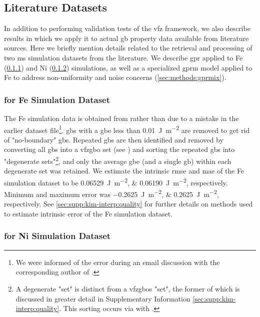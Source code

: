\documentclass[final,twocolumn,12pt]{elsarticle}
\begin{document}
\subsection{Literature Datasets}
\label{sec:methods:litdata}
In addition to performing validation tests of the \gls{vfz} framework, we also describe results in which we apply it to actual \gls{gb} property data available from literature sources. Here we briefly mention details related to the retrieval and processing of two \gls{ms} simulation datasets from the literature. We describe \gls{gpr} applied to Fe (\cref{sec:methods:gprsim}) and Ni (\cref{sec:methods:gprsim-Ni}) simulations, as well as a specialized \gls{gprm} model applied to Fe to address non-uniformity and noise concerns (\cref{sec:methods:gprmix}).

\subsubsection{ for Fe Simulation Dataset}
\label{sec:methods:gprsim}
The Fe simulation data is obtained from \cite{kimPhasefieldModeling3D2014} rather than \cite{kimIdentificationSchemeGrain2011} due to a mistake in the earlier dataset file\footnote{We were informed of the error during an email discussion with the corresponding author of \cite{kimPhasefieldModeling3D2014}.}. \Glspl{gb} with a \gls{gbe} less than \SI{0.01}{\joule\per\square\meter} are removed to get rid of "no-boundary" \glspl{gb}. Repeated \glspl{gb} are then identified and removed by converting all \glspl{gb} into a \gls{vfzgbo} set (see ) and sorting the repeated \glspl{gb} into "degenerate sets"\footnote{A degenerate "set" is distinct from a \glspl{vfzgbo} "set", the former of which is discussed in greater detail in Supplementary Information \cref{sec:supp:kim-interp:quality}. This sorting occurs via  with .}, and only the average \gls{gbe} (and a single \gls{gb}) within each degenerate set was retained. We estimate the intrinsic \gls{rmse} and \gls{mae} of the Fe simulation dataset to be \SIlist{0.06529;0.06190}{\joule\per\square\meter}, respectively. Minimum and maximum error was \SIlist{-0.2625;0.2625}{\joule\per\square\meter}, respectively. See \cref{sec:supp:kim-interp:quality} for further details on methods used to estimate intrinsic error of the Fe simulation dataset.

\subsubsection{ for Ni Simulation Dataset}
\label{sec:methods:gprsim-Ni}
\end{document}
